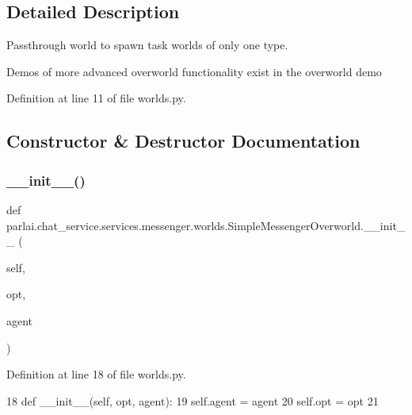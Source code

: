 \subsection{Detailed Description}
\begin{DoxyVerb}Passthrough world to spawn task worlds of only one type.

Demos of more advanced overworld functionality exist in the overworld demo
\end{DoxyVerb}
 

Definition at line 11 of file worlds.\+py.



\subsection{Constructor \& Destructor Documentation}
\mbox{\label{classparlai_1_1chat__service_1_1services_1_1messenger_1_1worlds_1_1SimpleMessengerOverworld_a0081e4e70d79093a7a03ce0a29ef52fa}} 
\subsubsection{\texorpdfstring{\+\_\+\+\_\+init\+\_\+\+\_\+()}{\_\_init\_\_()}}
{\footnotesize\ttfamily def parlai.\+chat\+\_\+service.\+services.\+messenger.\+worlds.\+Simple\+Messenger\+Overworld.\+\_\+\+\_\+init\+\_\+\+\_\+ (\begin{DoxyParamCaption}\item[{}]{self,  }\item[{}]{opt,  }\item[{}]{agent }\end{DoxyParamCaption})}



Definition at line 18 of file worlds.\+py.


\begin{DoxyCode}
18     \textcolor{keyword}{def }\_\_init\_\_(self, opt, agent):
19         self.agent = agent
20         self.opt = opt
21 
\end{DoxyCode}


